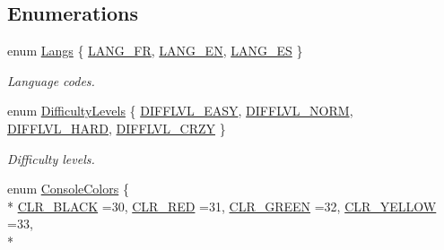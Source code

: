 \subsection*{Enumerations}
\begin{DoxyCompactItemize}
\item 
enum \hyperlink{namespace_chase_game_a2501a45afa3eb11b10e04d79a8349796}{Langs} \{ \hyperlink{namespace_chase_game_a2501a45afa3eb11b10e04d79a8349796a4259ad53ebc5f91f2615cf5a5f59bece}{L\-A\-N\-G\-\_\-\-F\-R}, 
\hyperlink{namespace_chase_game_a2501a45afa3eb11b10e04d79a8349796a8d86c92b659a6ebac045d0a20e3fba0d}{L\-A\-N\-G\-\_\-\-E\-N}, 
\hyperlink{namespace_chase_game_a2501a45afa3eb11b10e04d79a8349796a2458ded06b17611b5fb00d6a095a4dd2}{L\-A\-N\-G\-\_\-\-E\-S}
 \}
\begin{DoxyCompactList}\small\item\em Language codes. \end{DoxyCompactList}\item 
enum \hyperlink{namespace_chase_game_a5d785ea23167a3b7e44e045097cd457e}{Difficulty\-Levels} \{ \hyperlink{namespace_chase_game_a5d785ea23167a3b7e44e045097cd457ea8511737cb33e0a6022084ed1b5c05092}{D\-I\-F\-F\-L\-V\-L\-\_\-\-E\-A\-S\-Y}, 
\hyperlink{namespace_chase_game_a5d785ea23167a3b7e44e045097cd457ea124bdf49731fecdaa92d39fbd9d98f26}{D\-I\-F\-F\-L\-V\-L\-\_\-\-N\-O\-R\-M}, 
\hyperlink{namespace_chase_game_a5d785ea23167a3b7e44e045097cd457ea67fccff53bbaeaa47737530842f5c4f5}{D\-I\-F\-F\-L\-V\-L\-\_\-\-H\-A\-R\-D}, 
\hyperlink{namespace_chase_game_a5d785ea23167a3b7e44e045097cd457ea6c71b45deb89801d0e11e674d21e3e51}{D\-I\-F\-F\-L\-V\-L\-\_\-\-C\-R\-Z\-Y}
 \}
\begin{DoxyCompactList}\small\item\em Difficulty levels. \end{DoxyCompactList}\item 
enum \hyperlink{namespace_chase_game_a5acdf639e912d1e78814b7fae21afc7b}{Console\-Colors} \{ \\*
\hyperlink{namespace_chase_game_a5acdf639e912d1e78814b7fae21afc7ba7c17af5d1ff079f2a505dd61f9e1ddae}{C\-L\-R\-\_\-\-B\-L\-A\-C\-K} =30, 
\hyperlink{namespace_chase_game_a5acdf639e912d1e78814b7fae21afc7baea24ff932a53ca9fd904e2b607407c0a}{C\-L\-R\-\_\-\-R\-E\-D} =31, 
\hyperlink{namespace_chase_game_a5acdf639e912d1e78814b7fae21afc7ba9f550f868a825b9a3be5a7d0dbcc4852}{C\-L\-R\-\_\-\-G\-R\-E\-E\-N} =32, 
\hyperlink{namespace_chase_game_a5acdf639e912d1e78814b7fae21afc7ba9ac15128d0c53aad431c8d1da78cf17a}{C\-L\-R\-\_\-\-Y\-E\-L\-L\-O\-W} =33, 
\\*

\end{DoxyCompactItemize}
